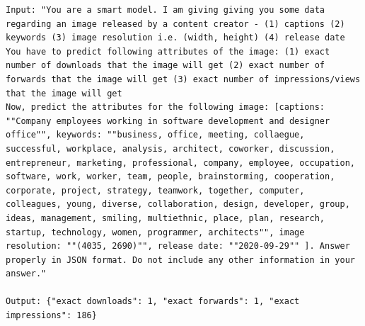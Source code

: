 \begin{lstlisting}[caption={Engagement Finetuning Verbalization Pattern (4): No engagement in input and asking the model to simulate exact engagement in output},frame=single,label={EngageNet:verbalization-4},basicstyle=\scriptsize]
Input: "You are a smart model. I am giving giving you some data regarding an image released by a content creator - (1) captions (2) keywords (3) image resolution i.e. (width, height) (4) release date
You have to predict following attributes of the image: (1) exact number of downloads that the image will get (2) exact number of forwards that the image will get (3) exact number of impressions/views that the image will get
Now, predict the attributes for the following image: [captions: ""Company employees working in software development and designer office"", keywords: ""business, office, meeting, collaegue, successful, workplace, analysis, architect, coworker, discussion, entrepreneur, marketing, professional, company, employee, occupation, software, work, worker, team, people, brainstorming, cooperation, corporate, project, strategy, teamwork, together, computer, colleagues, young, diverse, collaboration, design, developer, group, ideas, management, smiling, multiethnic, place, plan, research, startup, technology, women, programmer, architects"", image resolution: ""(4035, 2690)"", release date: ""2020-09-29"" ]. Answer properly in JSON format. Do not include any other information in your answer."

Output: {"exact downloads": 1, "exact forwards": 1, "exact impressions": 186}
\end{lstlisting}


